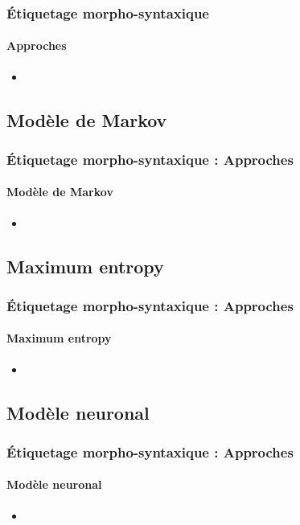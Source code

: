 \documentclass[xcolor=table]{beamer}
\begin{document}
\begin{frame}
\frametitle{Étiquetage morpho-syntaxique}
\framesubtitle{Approches}

\begin{itemize}
	\item 
\end{itemize}

\end{frame}

\subsection{Modèle de Markov}

\begin{frame}
\frametitle{Étiquetage morpho-syntaxique : Approches}
\framesubtitle{Modèle de Markov}

\begin{itemize}
	\item 
\end{itemize}

\end{frame}

\subsection{Maximum entropy}

\begin{frame}
\frametitle{Étiquetage morpho-syntaxique : Approches}
\framesubtitle{Maximum entropy}

\begin{itemize}
	\item 
\end{itemize}

\end{frame}

\subsection{Modèle neuronal}

\begin{frame}
\frametitle{Étiquetage morpho-syntaxique : Approches}
\framesubtitle{Modèle neuronal}

\begin{itemize}
	\item 
\end{itemize}

\end{frame}

\end{document}
